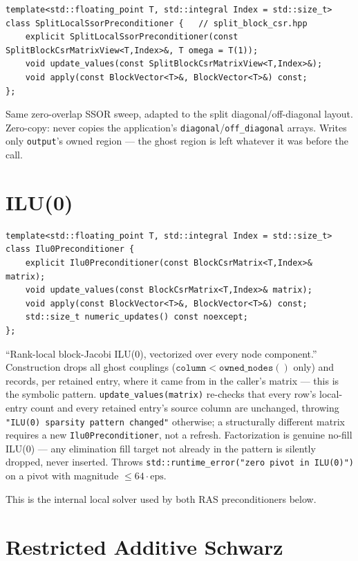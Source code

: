 \documentclass[11pt,a4paper]{report}
\begin{document}
\begin{lstlisting}
template<std::floating_point T, std::integral Index = std::size_t>
class SplitLocalSsorPreconditioner {   // split_block_csr.hpp
    explicit SplitLocalSsorPreconditioner(const SplitBlockCsrMatrixView<T,Index>&, T omega = T(1));
    void update_values(const SplitBlockCsrMatrixView<T,Index>&);
    void apply(const BlockVector<T>&, BlockVector<T>&) const;
};
\end{lstlisting}

Same zero-overlap SSOR sweep, adapted to the split diagonal/off-diagonal
layout. Zero-copy: never copies the application's
\lstinline!diagonal!/\lstinline!off_diagonal! arrays. Writes only \lstinline!output!'s owned
region --- the ghost region is left whatever it was before the call.

\section{ILU(0)}
\label{sec:6.3}

\begin{lstlisting}
template<std::floating_point T, std::integral Index = std::size_t>
class Ilu0Preconditioner {
    explicit Ilu0Preconditioner(const BlockCsrMatrix<T,Index>& matrix);
    void update_values(const BlockCsrMatrix<T,Index>& matrix);
    void apply(const BlockVector<T>&, BlockVector<T>&) const;
    std::size_t numeric_updates() const noexcept;
};
\end{lstlisting}

``Rank-local block-Jacobi ILU(0), vectorized over every node
component.'' Construction drops all ghost couplings
($\mathtt{column} < \mathtt{owned\_nodes()}$ only) and records, per
retained entry, where it came from in the caller's matrix --- this is
the symbolic pattern. \lstinline!update_values(matrix)! re-checks that every
row's local-entry count and every retained entry's source column are
unchanged, throwing \lstinline!"ILU(0) sparsity pattern changed"! otherwise; a
structurally different matrix requires a new \lstinline!Ilu0Preconditioner!,
not a refresh. Factorization is genuine no-fill ILU(0) --- any
elimination fill target not already in the pattern is silently
dropped, never inserted. Throws
\lstinline!std::runtime_error("zero pivot in ILU(0)")! on a pivot with
magnitude $\leq 64\cdot\mathrm{eps}$.

This is the internal local solver used by both RAS preconditioners
below.

\section{Restricted Additive Schwarz}
\label{sec:6.4}
\end{document}

